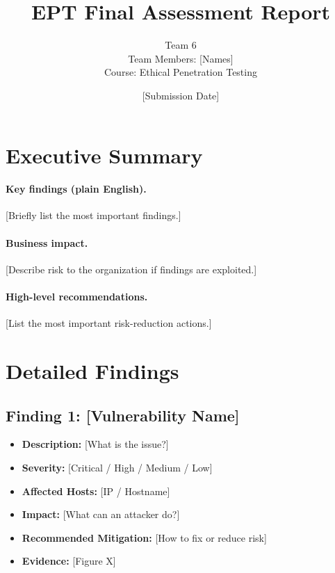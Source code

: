 \documentclass[11pt]{article}
\title{EPT Final Assessment Report}
\author{
Team 6 \\
Team Members: [Names] \\
Course: Ethical Penetration Testing
}
\date{[Submission Date]}
\begin{document}
\maketitle
\thispagestyle{fancy}

\newpage
\tableofcontents
\newpage

\section{Executive Summary}


\paragraph{Key findings (plain English).}
[Briefly list the most important findings.]

\paragraph{Business impact.}
[Describe risk to the organization if findings are exploited.]

\paragraph{High-level recommendations.}
[List the most important risk-reduction actions.]

\section{Detailed Findings}

\subsection*{Finding 1: [Vulnerability Name]}
\begin{itemize}
  \item \textbf{Description:} [What is the issue?]
  \item \textbf{Severity:} [Critical / High / Medium / Low]
  \item \textbf{Affected Hosts:} [IP / Hostname]
  \item \textbf{Impact:} [What can an attacker do?]
  \item \textbf{Recommended Mitigation:} [How to fix or reduce risk]
  \item \textbf{Evidence:} [Figure X]
\end{itemize}
\end{document}
